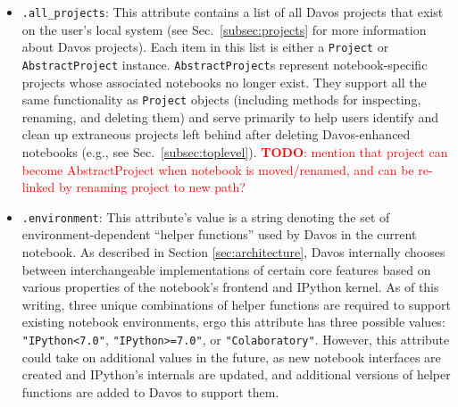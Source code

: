 \documentclass[preprint,12pt,a4paper]{elsarticle}
\begin{document}
%
%

\begin{itemize}

\item \texttt{.all\_projects}: This attribute contains a list of all Davos projects that exist on the user's local system (see Sec.~\ref{subsec:projects} for more information about Davos projects). Each item in this list is either a \texttt{Project} or \texttt{AbstractProject} instance. \texttt{AbstractProject}s represent notebook-specific projects whose associated notebooks no longer exist. They support all the same functionality as \texttt{Project} objects (including methods for inspecting, renaming, and deleting them) and serve primarily to help users identify and clean up extraneous projects left behind after deleting Davos-enhanced notebooks (e.g., see Sec.~\ref{subsec:toplevel}).
\textcolor{red}{\textbf{TODO}: mention that project can become AbstractProject when notebook is moved/renamed, and can be re-linked by renaming project to new path?}

\item \texttt{.environment}: This attribute's value is a string denoting the set of environment-dependent ``helper functions'' used by Davos in the current notebook. As described in Section \ref{sec:architecture}, Davos internally chooses between interchangeable implementations of certain core features
based on various properties of the notebook's frontend and IPython kernel. As of this writing, three unique combinations of helper functions are required to support existing notebook environments, ergo this attribute has three possible values: \texttt{"IPython<7.0"}, \texttt{"IPython>=7.0"}, or \texttt{"Colaboratory"}. However, this attribute could take on additional values in the future, as new notebook interfaces are created and IPython's internals are updated, and additional versions of helper functions are added to Davos to support them.


\end{itemize}
\end{document}
